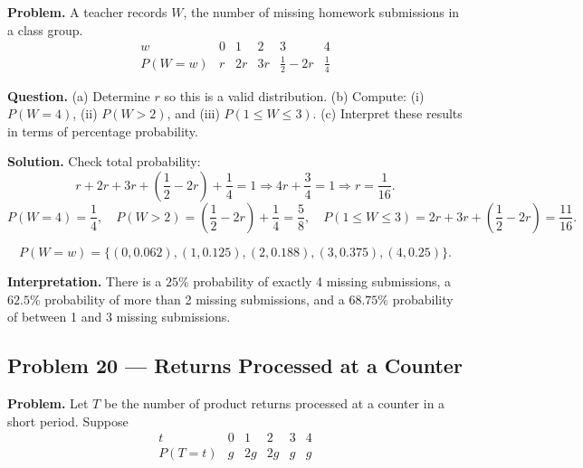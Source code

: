 \begin{ExamProblems}
		\textbf{Problem.}
		A teacher records $W$, the number of missing homework submissions in a class group.
		\[
		\begin{array}{c|ccccc}
			w & 0 & 1 & 2 & 3 & 4\\
			\hline
			P(W=w) & r & 2r & 3r & \frac{1}{2}-2r & \frac{1}{4}
		\end{array}
		\]
		
		\textbf{Question.}
		(a) Determine $r$ so this is a valid distribution.
		(b) Compute: (i) $P(W=4)$, (ii) $P(W>2)$, and (iii) $P(1\le W\le 3)$.
		(c) Interpret these results in terms of percentage probability.
		
		\textbf{Solution.}
		Check total probability:
		\[
		r+2r+3r+\left(\frac{1}{2}-2r\right)+\frac{1}{4}=1
		\Rightarrow 4r+\frac{3}{4}=1
		\Rightarrow r=\frac{1}{16}.
		\]
		\[
		P(W=4)=\frac{1}{4},\quad
		P(W>2)=\left(\frac{1}{2}-2r\right)+\frac{1}{4}=\frac{5}{8},\quad
		P(1\le W\le 3)=2r+3r+\left(\frac{1}{2}-2r\right)=\frac{11}{16}.
		\]
		
\[
		P(W=w)=\{(0,0.062),(1,0.125),(2,0.188),(3,0.375),(4,0.25)\}.
		\]
\begin{center}
		\end{center}
\textbf{Interpretation.} There is a $25\%$ probability of exactly 4 missing submissions, a $62.5\%$ probability of more than 2 missing submissions, and a $68.75\%$ probability of between 1 and 3 missing submissions.
		
		
		\item
		\subsection*{Problem 20 — Returns Processed at a Counter}
		
		\textbf{Problem.}
		Let $T$ be the number of product returns processed at a counter in a short period. Suppose
		\[
		\begin{array}{c|ccccc}
			t & 0 & 1 & 2 & 3 & 4\\
			\hline
			P(T=t) & g & 2g & 2g & g & g
		\end{array}
		\]
		

\end{ExamProblems}
